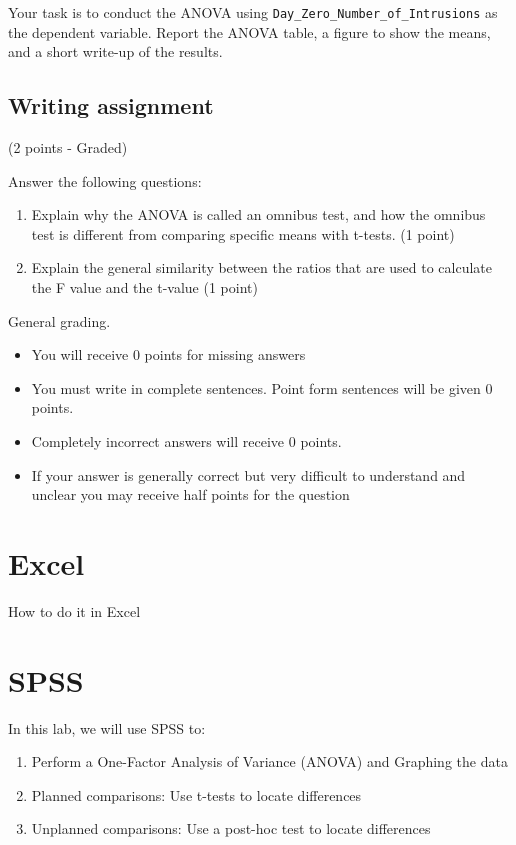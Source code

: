 \documentclass[
]{book}
\providecommand{\tightlist}{%
  \setlength{\itemsep}{0pt}\setlength{\parskip}{0pt}}
\begin{document}
Your task is to conduct the ANOVA using \texttt{Day\_Zero\_Number\_of\_Intrusions} as the dependent variable. Report the ANOVA table, a figure to show the means, and a short write-up of the results.

\hypertarget{writing-assignment-7}{%
\subsection{Writing assignment}\label{writing-assignment-7}}

(2 points - Graded)

Answer the following questions:

\begin{enumerate}
\def\labelenumi{\arabic{enumi}.}
\item
  Explain why the ANOVA is called an omnibus test, and how the omnibus test is different from comparing specific means with t-tests. (1 point)
\item
  Explain the general similarity between the ratios that are used to calculate the F value and the t-value (1 point)
\end{enumerate}

General grading.

\begin{itemize}
\tightlist
\item
  You will receive 0 points for missing answers
\item
  You must write in complete sentences. Point form sentences will be given 0 points.
\item
  Completely incorrect answers will receive 0 points.
\item
  If your answer is generally correct but very difficult to understand and unclear you may receive half points for the question
\end{itemize}

\hypertarget{excel-8}{%
\section{Excel}\label{excel-8}}

How to do it in Excel

\hypertarget{spss-8}{%
\section{SPSS}\label{spss-8}}

In this lab, we will use SPSS to:

\begin{enumerate}
\def\labelenumi{\arabic{enumi}.}
\tightlist
\item
  Perform a One-Factor Analysis of Variance (ANOVA) and Graphing the data
\item
  Planned comparisons: Use t-tests to locate differences
\item
  Unplanned comparisons: Use a post-hoc test to locate differences
\end{enumerate}
\end{document}
